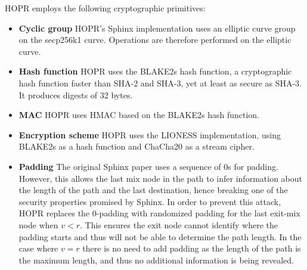 HOPR employs the following cryptographic primitives:

\begin{itemize}
    \item \textbf{Cyclic group} HOPR's Sphinx implementation uses an elliptic curve group on the secp256k1 curve. Operations are therefore performed on the elliptic curve.

    \item \textbf{Hash function} HOPR uses the BLAKE2s hash function, a cryptographic hash function faster than SHA-2 and SHA-3, yet at least as secure as SHA-3. It produces digests of 32 bytes.

    \item \textbf{MAC} HOPR uses HMAC based on the BLAKE2s hash function.

    \item \textbf{Encryption scheme} HOPR uses the LIONESS \cite{lionesspaper} implementation, using BLAKE2s as a hash function and ChaCha20 as a stream cipher.

    \item \textbf{Padding} The original Sphinx paper uses a sequence of 0s for padding. However, this allows the last mix node in the path to infer information about the length of the path and the last destination, hence breaking one of the security properties promised by Sphinx. In order to prevent this attack, HOPR replaces the 0-padding with randomized padding for the last exit-mix node when $v<r$. This ensures the exit node cannot identify where the padding starts and thus will not be able to determine the path length. In the case where $v=r$ there is no need to add padding as the length of the path is the maximum length, and thus no additional information is being revealed.

\end{itemize}
